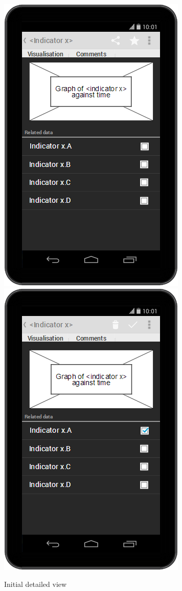 \documentclass[12pt,a4paper,twoside]{article}
\begin{document}
\begin{figure}[H]
\centering
\includegraphics[scale=0.4]{mocks/detailed_single.png}
\includegraphics[scale=0.4]{mocks/detailed_single_checked.png}
\caption{Initial detailed view}
\end{figure}
\end{document}
